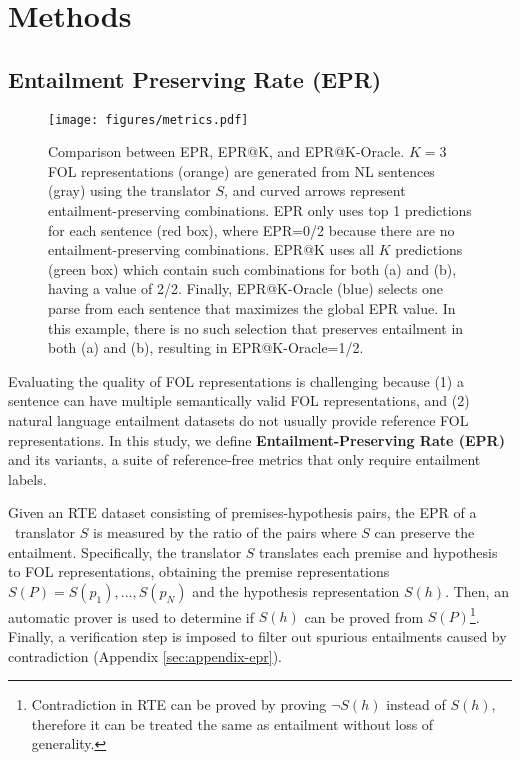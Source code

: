 \section{Methods}



\subsection{Entailment Preserving Rate (EPR)}

\begin{figure}[t]
    \centering
    \texttt{[image: figures/metrics.pdf]}
    \caption{Comparison between EPR, EPR@K, and EPR@K-Oracle. $K=3$ FOL representations (orange) are generated from NL sentences (gray) using the translator $S$, and curved arrows represent entailment-preserving combinations. EPR only uses top 1 predictions for each sentence (red box), where EPR=0/2 because there are no entailment-preserving combinations. EPR@K uses all $K$ predictions (green box) which contain such combinations for both (a) and (b), having a value of 2/2. Finally, EPR@K-Oracle (blue) selects one parse from each sentence that maximizes the global EPR value. In this example, there is no such selection that preserves entailment in both (a) and (b), resulting in EPR@K-Oracle=1/2.}
    \label{fig:metrics}
\end{figure}

Evaluating the quality of FOL representations is challenging because (1) a sentence can have multiple semantically valid FOL representations, and (2) natural language entailment datasets do not usually provide reference FOL representations. In this study, we define \textbf{Entailment-Preserving Rate (EPR)} and its variants, a suite of reference-free metrics that only require entailment labels.

Given an RTE dataset consisting of premises-hypothesis pairs, the EPR of a \nltofol\ translator $S$ is measured by the ratio of the pairs where $S$ can preserve the entailment. Specifically, the translator $S$ translates each premise and hypothesis to FOL representations, obtaining the premise representations $S(P) = S(p_1), ..., S(p_N)$ and the hypothesis representation $S(h)$. Then, an automatic prover is used to determine if $S(h)$ can be proved from $S(P)$\footnote{Contradiction in RTE can be proved by proving $\lnot S(h)$ instead of $S(h)$, therefore it can be treated the same as entailment without loss of generality.}. Finally, a verification step is imposed to filter out spurious entailments caused by contradiction (Appendix \ref{sec:appendix-epr}).

